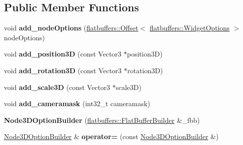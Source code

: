 \subsection*{Public Member Functions}
\begin{DoxyCompactItemize}
\item 
\mbox{\label{structflatbuffers_1_1Node3DOptionBuilder_a23c0907a8e9c0d51ab0f9b9a1d05334e}} 
void {\bfseries add\+\_\+node\+Options} (\hyperlink{structflatbuffers_1_1Offset}{flatbuffers\+::\+Offset}$<$ \hyperlink{structflatbuffers_1_1WidgetOptions}{flatbuffers\+::\+Widget\+Options} $>$ node\+Options)
\item 
\mbox{\label{structflatbuffers_1_1Node3DOptionBuilder_a2cba8c6f3098ef36cab05a9b3998ec2d}} 
void {\bfseries add\+\_\+position3D} (const Vector3 $\ast$position3D)
\item 
\mbox{\label{structflatbuffers_1_1Node3DOptionBuilder_a5884ba5241c12647d2cf7deb1a9ae886}} 
void {\bfseries add\+\_\+rotation3D} (const Vector3 $\ast$rotation3D)
\item 
\mbox{\label{structflatbuffers_1_1Node3DOptionBuilder_afa47d299fe4e74a3b399966f18e325e6}} 
void {\bfseries add\+\_\+scale3D} (const Vector3 $\ast$scale3D)
\item 
\mbox{\label{structflatbuffers_1_1Node3DOptionBuilder_a7ad54cea41dc4839edc2ff3df2dc1eff}} 
void {\bfseries add\+\_\+cameramask} (int32\+\_\+t cameramask)
\item 
\mbox{\label{structflatbuffers_1_1Node3DOptionBuilder_a0a962d7986e7769168ffe2d3ad241dde}} 
{\bfseries Node3\+D\+Option\+Builder} (\hyperlink{classflatbuffers_1_1FlatBufferBuilder}{flatbuffers\+::\+Flat\+Buffer\+Builder} \&\+\_\+fbb)
\item 
\mbox{\label{structflatbuffers_1_1Node3DOptionBuilder_af64efe00efa978ca61fbf716f2b55774}} 
\hyperlink{structflatbuffers_1_1Node3DOptionBuilder}{Node3\+D\+Option\+Builder} \& {\bfseries operator=} (const \hyperlink{structflatbuffers_1_1Node3DOptionBuilder}{Node3\+D\+Option\+Builder} \&)

\end{DoxyCompactItemize}
